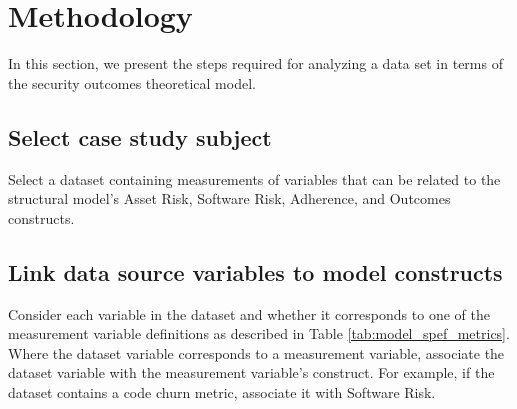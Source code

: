 \section{Methodology}
\label{sec:methodology}
In this section, we present the steps required for analyzing a data set in terms of the security outcomes theoretical model.

\subsection{Select case study subject}
Select a dataset containing measurements of variables that can be related to the structural model's Asset Risk, Software Risk, Adherence, and Outcomes constructs.  

\subsection{Link data source variables to model constructs}
Consider each variable in the dataset and whether it corresponds to one of the measurement variable definitions as described in Table \ref{tab:model_spef_metrics}. Where the dataset variable corresponds to a measurement variable, associate the dataset variable with the measurement variable's construct. For example, if the dataset contains a code churn metric, associate it with Software Risk.

